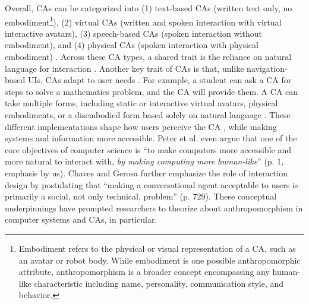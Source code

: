 \documentclass[manuscript,screen,review,anonymous]{acmart}
\begin{document}
Overall, %
CAs can be categorized into (1) text-based CAs (written text only, no embodiment\footnote{Embodiment refers to the physical or visual representation of a CA, such as an avatar or robot body. While embodiment is one possible anthropomorphic attribute, anthropomorphism is a broader concept encompassing any human-like characteristic including name, personality, communication style, and behavior.}), (2) virtual CAs (written and spoken interaction with virtual interactive avatars), (3) speech-based CAs (spoken interaction without embodiment), and (4) physical CAs (spoken interaction with physical embodiment) \citep{diederich_design_2022}. 
Across these CA types, a shared trait is the reliance on natural language for interaction \citep{diederich_design_2022}. 
Another key trait of CAs is that, unlike navigation-based UIs, CAs adapt to user needs \citep{folstad2017chatbots,jain2018evaluating}. For example, a student can ask a CA for steps to solve a mathematics problem, and the CA will provide them. A CA can take multiple forms, including static or interactive virtual avatars, physical embodiments, or a disembodied form based solely on natural language \citep{diederich_conversational_2019,diederich_design_2022}. These different implementations shape how users perceive the CA \citep{peter_benefits_2025}, while making systems and information more accessible. Peter et al. \cite{peter_benefits_2025} even argue that one of the core objectives of computer science is ``to make computers more accessible and more natural to interact with, \textit{by making computing more human-like}'' (p. 1, emphasis by us). Chaves and Gerosa \cite{chaves2021should} further emphasize the role of interaction design by postulating that ``making a conversational agent acceptable to users is primarily a social, not only technical, problem'' (p. 729). These conceptual underpinnings have prompted researchers to theorize about anthropomorphism in computer systems and CAs, in particular.

\end{document}
